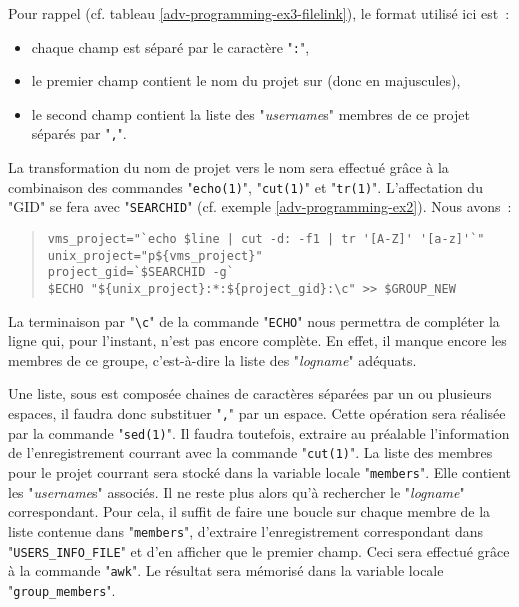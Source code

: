 Pour rappel (cf. tableau \ref{adv-programming-ex3-filelink}), le format utilis{\'e} ici
est~:
\begin{itemize}
	\item	chaque champ est s{\'e}par{\'e} par le caract{\`e}re "{\tt :}",
	\item	le premier champ contient le nom du projet sur {\OpenVMS} (donc en
			majuscules),
	\item	le second champ contient la liste des "{\sl username}s" {\OpenVMS}
			membres de ce projet s{\'e}par{\'e}s par "{\tt ,}".
\end{itemize}
La transformation du nom de projet {\OpenVMS} vers le nom {\Unix} sera effectu{\'e}
gr{\^a}ce {\`a} la combinaison des commandes "{\tt echo(1)}", "{\tt cut(1)}" et
"{\tt tr(1)}". L'affectation du "GID" se fera avec "{\tt SEARCHID}"
(cf. exemple \ref{adv-programming-ex2}). Nous avons~:
\begin{quote}
\begin{verbatim}
vms_project="`echo $line | cut -d: -f1 | tr '[A-Z]' '[a-z]'`"
unix_project="p${vms_project}"
project_gid=`$SEARCHID -g`
$ECHO "${unix_project}:*:${project_gid}:\c" >> $GROUP_NEW
\end{verbatim}
\end{quote}

\begin{remarque}
La terminaison par "\verb=\c=" de la commande "{\tt ECHO}" nous permettra
de compl{\'e}ter la ligne qui, pour l'instant, n'est pas encore compl{\`e}te. En effet, il
manque encore les membres de ce groupe, c'est-{\`a}-dire la liste des "{\sl logname}"
{\Unix} ad{\'e}quats.
\end{remarque}

Une liste, sous {\Unix} est compos{\'e}e chaines de caract{\`e}res s{\'e}par{\'e}es par
un ou plusieurs espaces, il faudra donc substituer "{\tt ,}" par un
espace. Cette op{\'e}ration sera r{\'e}alis{\'e}e par la commande
"{\tt sed(1)}". Il faudra toutefois, extraire au pr{\'e}alable l'information de
l'enregistrement courrant avec la commande "{\tt cut(1)}". La liste
des membres pour le projet courrant sera stock{\'e} dans la variable locale
"{\tt members}". Elle contient les "{\sl username}s" {\OpenVMS}
associ{\'e}s. Il ne reste plus alors qu'{\`a} rechercher le "{\sl logname}"
{\Unix} correspondant. Pour cela, il suffit de faire une boucle sur
chaque membre de la liste contenue dans "{\tt members}", d'extraire
l'enregistrement correspondant dans "{\tt USERS\_INFO\_FILE}" et
d'en afficher que le premier champ. Ceci sera effectu{\'e} gr{\^a}ce {\`a} la commande
"{\tt awk}". Le r{\'e}sultat sera m{\'e}moris{\'e} dans la variable locale
"{\tt group\_members}".

